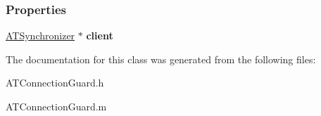 \subsubsection*{Properties}
\begin{DoxyCompactItemize}
\item 
\hypertarget{interface_a_t_connection_guard_a6cafd79831265da735d92cec478192a0}{
\hyperlink{interface_a_t_synchronizer}{ATSynchronizer} $\ast$ {\bfseries client}}
\label{interface_a_t_connection_guard_a6cafd79831265da735d92cec478192a0}

\end{DoxyCompactItemize}


The documentation for this class was generated from the following files:\begin{DoxyCompactItemize}
\item 
ATConnectionGuard.h\item 
ATConnectionGuard.m\end{DoxyCompactItemize}
